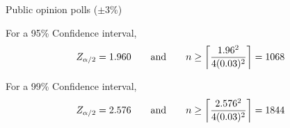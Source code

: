     \newpage \noindent \example* Public opinion polls ($\pm 3\%$)

    \nnl For a 95\% Confidence interval,
    $$Z_{\alpha/2} = 1.960 \qquad \text{and} \qquad n \geq \ceiling{\frac{1.96^2}{4(0.03)^2}} = 1068$$

    \nnl For a 99\% Confidence interval,
    $$Z_{\alpha/2} = 2.576 \qquad \text{and} \qquad n \geq \ceiling{\frac{2.576^2}{4(0.03)^2}} = 1844$$